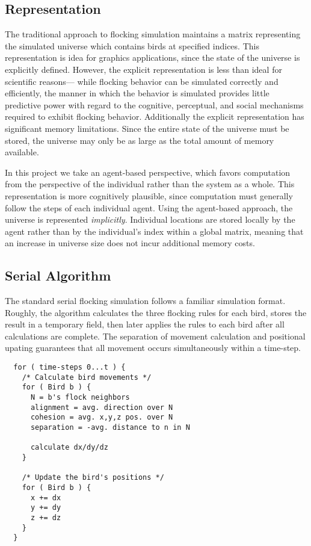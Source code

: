 \subsection*{Representation}
The traditional approach to flocking simulation maintains a matrix
representing the simulated universe which contains birds at specified
indices. This representation is idea for graphics applications, since
the state of the universe is explicitly defined. However, the explicit
representation is less than ideal for scientific reasons--- while
flocking behavior can be simulated correctly and efficiently, the
manner in which the behavior is simulated provides little predictive
power with regard to the cognitive, perceptual, and social mechanisms
required to exhibit flocking behavior. Additionally the explicit
representation has significant memory limitations. Since the entire
state of the universe must be stored, the universe may only be as
large as the total amount of memory available.

In this project we take an agent-based perspective, which favors
computation from the perspective of the individual rather than the
system as a whole. This representation is more cognitively plausible,
since computation must generally follow the steps of each individual
agent. Using the agent-based approach, the universe is represented
\emph{implicitly}. Individual locations are stored locally by the
agent rather than by the individual's index within a global matrix,
meaning that an increase in universe size does not incur additional
memory costs. 

\subsection*{Serial Algorithm}
The standard serial flocking simulation follows a familiar simulation
format. Roughly, the algorithm calculates the three flocking rules for
each bird, stores the result in a temporary field, then later applies
the rules to each bird after all calculations are complete. The
separation of movement calculation and positional upating guarantees
that all movement occurs simultaneously within a time-step.

\begin{verbatim}
  for ( time-steps 0...t ) {
    /* Calculate bird movements */
    for ( Bird b ) {
      N = b's flock neighbors
      alignment = avg. direction over N
      cohesion = avg. x,y,z pos. over N
      separation = -avg. distance to n in N

      calculate dx/dy/dz
    }

    /* Update the bird's positions */
    for ( Bird b ) {
      x += dx
      y += dy
      z += dz
    }
  }
\end{verbatim}

